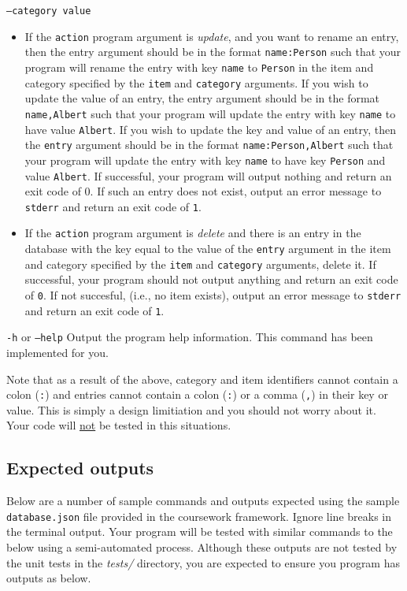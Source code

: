 \documentclass[a4paper]{article}
\begin{document}
\begin{labeling}{ \texttt{--category value} }
\begin{itemize}
        \item If the \texttt{action} program argument is \emph{update}, and you want to rename an entry, then the entry argument should be in the format \texttt{name:Person} such that your program will rename the entry with key \texttt{name} to \texttt{Person} in the item and category specified by the \texttt{item} and \texttt{category} arguments. If you wish to update the value of an entry, the entry argument should be in the format \texttt{name,Albert} such that your program will update the entry with key \texttt{name} to have value \texttt{Albert}. If you wish to update the key and value of an entry, then the \texttt{entry} argument should be in the format \texttt{name:Person,Albert} such that your program will update the entry with key \texttt{name} to have key \texttt{Person} and value \texttt{Albert}. If successful, your program will output nothing and return an exit code of 0.  If such an entry does not exist, output an error message to \texttt{stderr} and return an exit code of \texttt{1}.
    
        \item If the \texttt{action} program argument is \emph{delete} and there is an entry in the database with the key equal to the value of the \texttt{entry} argument in the item and category specified by the \texttt{item} and \texttt{category} arguments, delete it. If successful, your program should not output anything and return an exit code of \texttt{0}. If not succesful, (i.e., no item exists), output an error message to \texttt{stderr} and return an exit code of \texttt{1}.
        \end{itemize}
    
    \item[\texttt{-h} or \texttt{--help}]
    Output the program help information. This command has been implemented for you.
\end{labeling}

Note that as a result of the above, category and item identifiers cannot contain a colon (\texttt{:}) and entries cannot contain a colon (\texttt{:}) or a comma (\texttt{,}) in their key or value. This is simply a design limitiation and you should not worry about it. Your code will \underline{not} be tested in this situations.

\subsection*{Expected outputs}\label{sec:cwk outputs}
Below are a number of sample commands and outputs expected using the sample \texttt{database.json} file provided in the coursework framework. Ignore line breaks in the terminal output. Your program will be tested with similar commands to the below using a semi-automated process. Although these outputs are not tested by the unit tests in the \emph{tests/} directory, you are expected to ensure you program has outputs as below.
\end{document}
